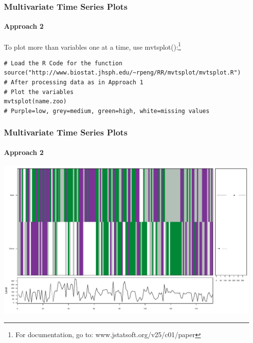 \begin{frame}[fragile]
 \frametitle{Multivariate Time Series Plots}
 \framesubtitle{Approach 2}

To plot more than variables one at a time, use \ttfamily mvtsplot()\normalfont :\footnote{For documentation, go to: www.jstatsoft.org/v25/c01/paper}
		\begin{lstlisting}
# Load the R Code for the function
source("http://www.biostat.jhsph.edu/~rpeng/RR/mvtsplot/mvtsplot.R")		
# After processing data as in Approach 1
# Plot the variables
mvtsplot(name.zoo)
# Purple=low, grey=medium, green=high, white=missing values
		\end{lstlisting}
\end{frame}

\begin{frame}[fragile]
 \frametitle{Multivariate Time Series Plots}
 \framesubtitle{Approach 2}

       \begin{center}
         \includegraphics[width=1\textwidth]{images/Mtvsplot2.pdf}
        \end{center}
\end{frame}

